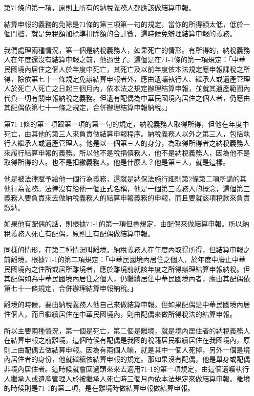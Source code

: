 \documentclass[oneside,sub3section]{ctexbook}
\begin{document}
第71條的第一項，原則上所有的納稅義務人都應該做結算申報。

結算申報的義務的免除是71條的第三項第一句的規定，當你的所得額太低，低於一個門檻，就是免稅額加標準扣除額的合計數，這時候免辦理結算申報的義務。

我們處理兩種情況，第一個是納稅義務人，如果死亡的情形。有所得的，納稅義務人在年度還沒有結算申報之前，他過世了。這個是在71-1條的第一項規定：「中華民國境內居住之個人於年度中死亡，其死亡及以前年度依本法規定應申報課稅之所得，除依第七十一條規定免辦結算申報者外，應由遺囑執行人、繼承人或遺產管理人於死亡人死亡之日起三個月內，依本法之規定辦理結算申報，並就其遺產範圍內代負一切有關申報納稅之義務。但遺有配偶為中華民國境內居住之個人者，仍應由其配偶依第七十一條之規定，合併辦理結算申報納稅。」

第71-1條的第一項跟第一項的第一句的規定，納稅義務人取得所得，但他在年度中死亡，由其他的第三人來負責做結算申報程序。納稅義務人以外之第三人，包括執行人繼承人或遺產管理人。他是以一個第三人的身分，為取得所得者之納稅義務人來履行結算申報的義務。所以他不是稅捐債務人，他不是納稅義務人，因為他不是取得所得的人。也不是扣繳義務人。他是什麼人？他是第三人，就是這樣。

他是被法律賦予給他一個行為義務，這就是納保法施行細則第2條第二項所講的其他行為義務。法律沒有給他一個正式名稱，他是一個第三義務人的概念，這個第三義務人要負責來去做納稅義務人的結算申報義務的申報，而且要就該項稅款來負責繳納。

如果他有配偶的話，則根據71-1的第一項但書規定，由配偶來做結算申報。所以納稅義務人死亡有配偶，原則上有配偶做結算申報。

同樣的情形，在第二種情況叫離境。納稅義務人在年度內取得所得，但結算申報之前離境，根據71-1的第二項規定：「中華民國境內居住之個人，於年度中廢止中華民國境內之住所或居所離境者，應於離境前就該年度之所得辦理結算申報納稅。但其配偶如為中華民國境內居住之個人，仍繼續居住中華民國境內者，應由其配偶依第七十一條規定，合併辦理結算申報納稅。」

離境的時候，要由納稅義務人他自己來做結算申報。但如果配偶是中華民國境內居住個人，而且繼續居住在中華民國境內，則由配偶來做所得稅法的結算申報。

所以主要兩種情況，第一個是死亡，第二個是離境，就是境內居住者的納稅義務人在結算申報之前離境，這個時候有配偶是我國的稅籍居民繼續居住在我國境內，原則上由配偶去做結算申報。因為有兩個人嘛，就是其中一個人死掉，另外一個是境內居住者的身份，他就繼續依結算申報的規定。那如果沒有配偶，他是單身或配偶非境內居住者。這時候就會回過頭來來去適用71-1的第一項規定，由這個遺囑執行人繼承人或遺產管理人於被繼承人死亡時三個月內依本法規定來做結算申報。離境的時候則是71-1的第二項，是在離境時做結算申報做結算申報。
\end{document}
